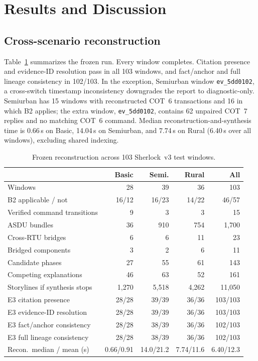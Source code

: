 \documentclass[conference]{IEEEtran}
\begin{document}
\section{Results and Discussion}
\subsection{Cross-scenario reconstruction}
Table~\ref{tab:cross} summarizes the frozen run.
Every window completes.
Citation presence and evidence-ID resolution pass in all 103 windows, and fact/anchor and full lineage consistency in 102/103.
In the exception, Semiurban window \texttt{ev\_5dd0102}, a cross-switch timestamp inconsistency downgrades the report to diagnostic-only.
Semiurban has 15 windows with reconstructed COT~6 transactions and 16 in which B2 applies; the extra window, \texttt{ev\_5dd0102}, contains 62 unpaired COT~7 replies and no matching COT~6 command.
Median reconstruction-and-synthesis time is 0.66\,s on Basic, 14.04\,s on Semiurban, and 7.74\,s on Rural (6.40\,s over all windows), excluding shared indexing.

\begin{table}[t]
\caption{Frozen reconstruction across 103 Sherlock~v3 test windows.}
\label{tab:cross}
\centering
\scriptsize
\setlength{\tabcolsep}{2.2pt}
\begin{tabular}{@{}lrrrr@{}}
\toprule
 & Basic & Semi. & Rural & All \\
\midrule
Windows & 28 & 39 & 36 & 103 \\
B2 applicable / not & 16/12 & 16/23 & 14/22 & 46/57 \\
Verified command transitions & 9 & 3 & 3 & 15 \\
ASDU bundles & 36 & 910 & 754 & 1{,}700 \\
Cross-RTU bridges & 6 & 6 & 11 & 23 \\
Bridged components & 3 & 2 & 6 & 11 \\
Candidate phases & 27 & 55 & 61 & 143 \\
Competing explanations & 46 & 63 & 52 & 161 \\
Storylines if synthesis stops & 1{,}270 & 5{,}518 & 4{,}262 & 11{,}050 \\
E3 citation presence & 28/28 & 39/39 & 36/36 & 103/103 \\
E3 evidence-ID resolution & 28/28 & 39/39 & 36/36 & 103/103 \\
E3 fact/anchor consistency & 28/28 & 38/39 & 36/36 & 102/103 \\
E3 full lineage consistency & 28/28 & 38/39 & 36/36 & 102/103 \\
Recon.\ median / mean (s) & 0.66/0.91 & 14.0/21.2 & 7.74/11.6 & 6.40/12.3 \\
\bottomrule
\end{tabular}
\end{table}
\end{document}
